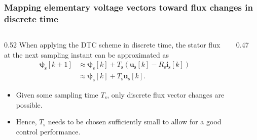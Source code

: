 \begin{frame}[b]
    \frametitle{Mapping elementary voltage vectors toward flux changes in discrete time}
    \vspace{0.3em}
    \begin{columns}[T,onlytextwidth]
        \begin{column}{0.52\textwidth}
            When applying the DTC scheme in discrete time, the stator flux at the next sampling instant can be approximated as
            \begin{align*}
                \bm{\psi}_\mathrm{s}[k+1] & \approx \bm{\psi}_\mathrm{s}[k] + T_\mathrm{s} \left( \bm{u}_\mathrm{s}[k] - R_\mathrm{s}\bm{i}_\mathrm{s}[k] \right) \\
                                          & \approx \bm{\psi}_\mathrm{s}[k] + T_\mathrm{s} \bm{u}_\mathrm{s}[k].
            \end{align*}
            \begin{itemize}
                \item<3-> Given some sampling time $T_\mathrm{s}$, only discrete flux vector changes are possible.
                \item<4-> Hence, $T_\mathrm{s}$ needs to be chosen sufficiently small to allow for a good control performance.
            \end{itemize}
        \end{column}
        \begin{column}{0.47\textwidth}
            \centering
            \vspace{-0.275cm}
            \begin{figure}
\end{figure}
\end{column}
\end{columns}
\end{frame}
